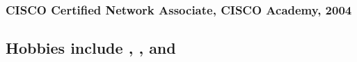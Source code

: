 \documentclass[
]{article}
\begin{document}
\hypertarget{fontawesome-solid-network-wired-cisco-certified-network-associate-cisco-academy-2004}{%
\subsubsection{\texorpdfstring{\faNetworkWired CISCO Certified Network
Associate, CISCO Academy,
2004}{ CISCO Certified Network Associate, CISCO Academy, 2004}}\label{fontawesome-solid-network-wired-cisco-certified-network-associate-cisco-academy-2004}}

\hypertarget{material-gamepad-hobbies-include-pizza-material-bike-and-simple-linux}{%
\subsection{\texorpdfstring{\faGamepad Hobbies include \faPizzaSlice ,
\faBicycle , and
\faLinux}{ Hobbies include  ,  , and }}\label{material-gamepad-hobbies-include-pizza-material-bike-and-simple-linux}}
\end{document}
